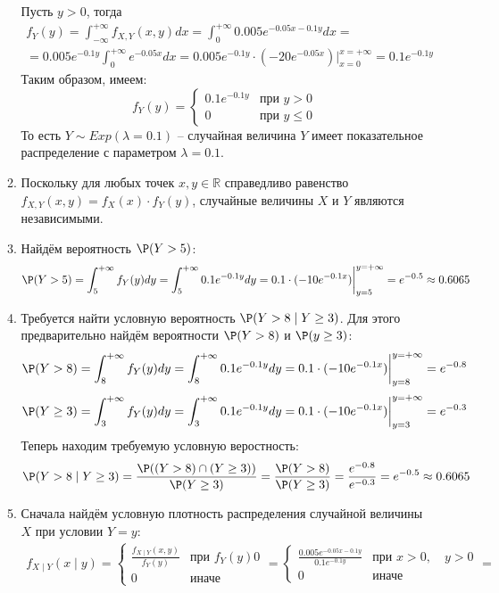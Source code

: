 \begin{enumerate}
\begin{enumerate}
Пусть $y > 0 $, тогда
\begin{multline*}
f_Y (y) = \int_{-\infty}^{+\infty} f_{X, Y} (x, y) dx  = \int_{0}^{+\infty} 0.005 e^{-0.05x-0.1y} dx = \\
= 0.005e^{-0.1y} \int_{0}^{+\infty} e^{-0.05x} dx = 0.005e^{-0.1y} \cdot \left(-20e^{-0.05x} \right) \bigg\vert_{x=0}^{x=+\infty} = 0.1 e^{-0.1y}
\end{multline*}
Таким образом, имеем:
\[
f_Y (y) = \begin{cases}
0.1 e^{-0.1y} & \text{при } y>0 \\
0 & \text{при } y \leq 0
\end{cases}
\]
То есть $Y \sim Exp(\lambda=0.1)$ – случайная величина $Y$ имеет показательное распределение с параметром $\lambda = 0.1$.
\item Поскольку для любых точек $x, y \in \mathbb{R}$ справедливо равенство $f_{X, Y} (x, y) = f_X (x) \cdot f_Y (y)$, случайные величины $X$ и $Y$ являются независимыми.
\item Найдём вероятность $\P(Y>5)$:
\[
\P(Y>5) = \int_{5}^{+\infty} f_Y (y) dy = \int_{5}^{+\infty}  0.1 e^{-0.1y} dy = 0.1 \cdot (-10 e^{-0.1x}) \bigg\vert_{y=5}^{y=+\infty} = e^{-0.5} \approx0.6065
\]
\item Требуется найти условную вероятность $\P(Y>8 \mid Y \geq 3)$. Для этого предварительно найдём вероятности $\P(Y>8)$ и $\P(y \geq 3)$:
\[
\P(Y>8) = \int_{8}^{+\infty} f_Y (y) dy  = \int_{8}^{+\infty}  0.1 e^{-0.1y} dy = 0.1 \cdot (-10 e^{-0.1x}) \bigg\vert_{y=8}^{y=+\infty} = e^{-0.8}
\]
\[
\P(Y \geq 3) =  \int_{3}^{+\infty} f_Y (y) dy   =  \int_{3}^{+\infty}  0.1 e^{-0.1y} dy = 0.1 \cdot (-10 e^{-0.1x}) \bigg\vert_{y=3}^{y=+\infty} = e^{-0.3}
\]
Теперь находим требуемую условную веростность:
\[
\P(Y>8 \mid Y \geq 3) = \frac{\P((Y > 8) \cap
(Y \geq 3))}{\P(Y \geq 3)} = \frac{\P(Y>8)}{\P(Y \geq 3) } = \frac{e^{-0.8}}{e^{-0.3}} = e^{-0.5} \approx0.6065
\]
\item Сначала найдём условную плотность распределения случайной величины $X$ при условии $Y=y$:
\begin{multline*}
f_{X \mid Y} (x \mid y) = \begin{cases}
\frac{f_{X \mid Y} (x, y)}{f_Y (y)} & \text{при } f_Y (y) 0 \\
0 & \text{иначе}
\end{cases} =
\begin{cases}
\frac{0.005e^{-0.05x-0.1y}}{0.1e^{-0.1y}} & \text{при } x>0, \quad y>0 \\
0 & \text{иначе}
\end{cases} = \\

\end{multline*}
\end{enumerate}
\end{enumerate}
